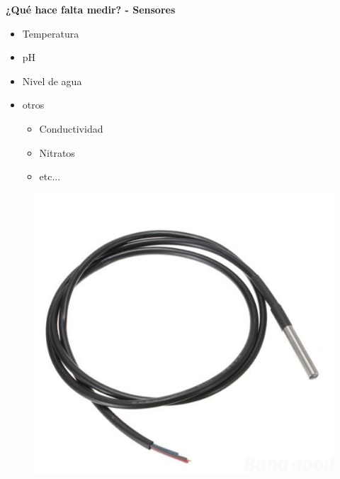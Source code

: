 \documentclass{beamer}
\begin{document}
\begin{frame}{\textbf{¿Qué hace falta medir? - Sensores}}
\begin{minipage}[c]{1.0\linewidth}
\begin{minipage}[c]{0.6\linewidth}
      \centering
      \begin{itemize}
      	\item Temperatura
		\vspace{10px}
		\item pH
		\vspace{10px}
		\item Nivel de agua
		\vspace{10px}
		\item otros
			\begin{itemize}
				\item Conductividad
				\item Nitratos
				\item etc...
			\end{itemize}
	\end{itemize}
 \end{minipage}
  \begin{minipage}[c]{0.35\linewidth}
	\begin{figure}[H]
		{\includegraphics[width=1\textwidth]{./imagenes/sensor_temp}\vspace{5px}}

\end{figure}
\end{minipage}
\end{minipage}
\end{frame}
\end{document}
